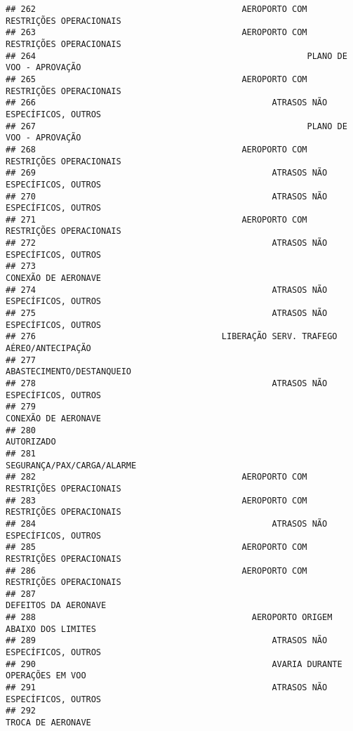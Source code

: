 \documentclass[
]{article}
\begin{document}
\begin{verbatim}
## 262                                         AEROPORTO COM RESTRIÇÕES OPERACIONAIS
## 263                                         AEROPORTO COM RESTRIÇÕES OPERACIONAIS
## 264                                                      PLANO DE VOO - APROVAÇÃO
## 265                                         AEROPORTO COM RESTRIÇÕES OPERACIONAIS
## 266                                               ATRASOS NÃO ESPECÍFICOS, OUTROS
## 267                                                      PLANO DE VOO - APROVAÇÃO
## 268                                         AEROPORTO COM RESTRIÇÕES OPERACIONAIS
## 269                                               ATRASOS NÃO ESPECÍFICOS, OUTROS
## 270                                               ATRASOS NÃO ESPECÍFICOS, OUTROS
## 271                                         AEROPORTO COM RESTRIÇÕES OPERACIONAIS
## 272                                               ATRASOS NÃO ESPECÍFICOS, OUTROS
## 273                                                           CONEXÃO DE AERONAVE
## 274                                               ATRASOS NÃO ESPECÍFICOS, OUTROS
## 275                                               ATRASOS NÃO ESPECÍFICOS, OUTROS
## 276                                     LIBERAÇÃO SERV. TRAFEGO AÉREO/ANTECIPAÇÃO
## 277                                                     ABASTECIMENTO/DESTANQUEIO
## 278                                               ATRASOS NÃO ESPECÍFICOS, OUTROS
## 279                                                           CONEXÃO DE AERONAVE
## 280                                                                    AUTORIZADO
## 281                                                    SEGURANÇA/PAX/CARGA/ALARME
## 282                                         AEROPORTO COM RESTRIÇÕES OPERACIONAIS
## 283                                         AEROPORTO COM RESTRIÇÕES OPERACIONAIS
## 284                                               ATRASOS NÃO ESPECÍFICOS, OUTROS
## 285                                         AEROPORTO COM RESTRIÇÕES OPERACIONAIS
## 286                                         AEROPORTO COM RESTRIÇÕES OPERACIONAIS
## 287                                                          DEFEITOS DA AERONAVE
## 288                                           AEROPORTO ORIGEM ABAIXO DOS LIMITES
## 289                                               ATRASOS NÃO ESPECÍFICOS, OUTROS
## 290                                               AVARIA DURANTE OPERAÇÕES EM VOO
## 291                                               ATRASOS NÃO ESPECÍFICOS, OUTROS
## 292                                                             TROCA DE AERONAVE

\end{verbatim}
\end{document}
